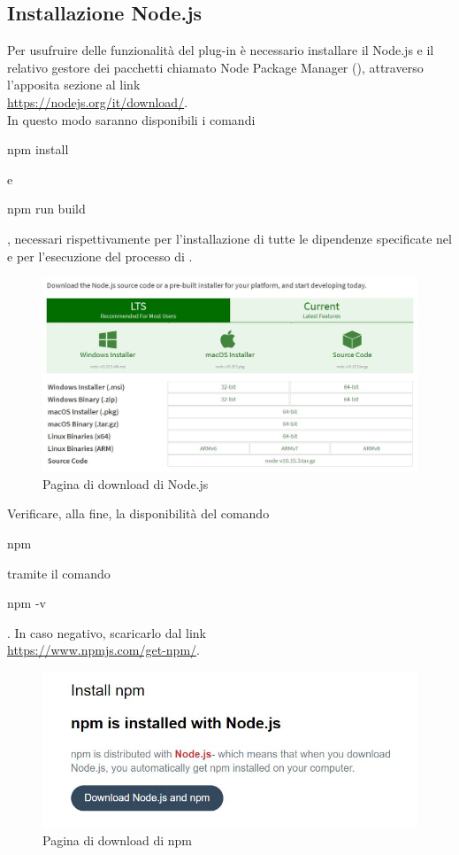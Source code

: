 \subsection{Installazione Node.js}
Per usufruire delle funzionalità del plug-in è necessario installare il  Node.js e il relativo gestore dei pacchetti chiamato Node Package Manager (), attraverso l'apposita sezione al link\\[0.2cm]
\hspace*{10mm}\url{https://nodejs.org/it/download/}.\\[0.2cm] In questo modo saranno disponibili i comandi \begin{ttfamily}npm install\end{ttfamily} e \begin{ttfamily}npm run build\end{ttfamily}, necessari rispettivamente per l'installazione di tutte le dipendenze specificate nel  e per l'esecuzione del processo di .
\begin{figure} [H]
	\centerline{
		\includegraphics[scale=0.5]{Img/node1}}
	\caption{Pagina di download di Node.js}\label{}
\end{figure}
Verificare, alla fine, la disponibilità del comando \begin{ttfamily}npm\end{ttfamily} tramite il comando \begin{ttfamily}npm -v\end{ttfamily}. In caso negativo, scaricarlo dal link \\[0.2cm]
\hspace*{10mm}\url{https://www.npmjs.com/get-npm/}.
\begin{figure} [H]
	\centerline{
		\includegraphics[scale=0.75]{Img/node}}
	\caption{Pagina di download di npm}\label{}
\end{figure}
